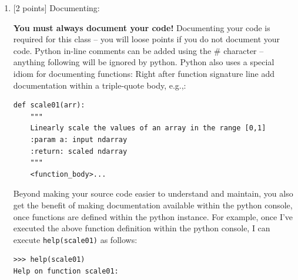 \documentclass[10pt]{article}
\begin{document}
\begin{enumerate}
\begin{verbatim}

def main():
    """
    main
    :param: none
    :return: void
    """
    exercise6("../data/humu.txt", "out.txt")

def scale01(arr):
    """
    Linearly scale the values of an array in the range [0,1]
    :param arr: input ndarray
    :return: scaled ndarray
    """
    return arr / arr.max()
    
def exercise6(infile, outfile):
    """
    Read a file into a Numpy ndarray
    :param infile: the file to read
    :param outfile: where to write the output
    :return: void
    """
    dat = np.loadtxt(infile)

    scaled = scale01(dat)
    print('scaled min = {} max = {} shape = {}'.format(scaled.min(),
                                                       scaled.max(),
                                                       scaled.shape))

    plt.figure()
    plt.imshow(dat)
    plt.show()

    print(plt.cm.cmapname)

    plt.imshow(dat, cmap='gray')
    plt.show()

    for _ in range(0, 2):
        ran = np.random.random(dat.shape)
        plt.imshow(ran)
        plt.show()
        np.savetxt(outfile, ran)

    ran1 = np.loadtxt(outfile)
    plt.imshow(ran1)
    plt.show()

    print('Done.')

if __name__ == '__main__':
    main()

$ ./hw1.py
type = <class 'numpy.ndarray'>
size = 210816
shape = (366, 576)
max = 0.9450980392156862
min = 0.0
scaled min = 0.0 max = 1.0 shape = (366, 576)
tab20c_r
Done.

\end{verbatim}


\item \label{prob:8} [2 points]
Documenting:

{\bf You must always document your code!}  Documenting your code is {\color{red} required} for this class -- you will loose points if you do not document your code.  Python in-line comments can be added using the \# character -- anything following will be ignored by python.  Python also uses a special idiom for documenting functions: Right after function signature line add documentation within a triple-quote body, e.g.,:
\begin{verbatim}
def scale01(arr):
    """
    Linearly scale the values of an array in the range [0,1]
    :param a: input ndarray
    :return: scaled ndarray
    """
    <function_body>...
\end{verbatim}
Beyond making your source code easier to understand and maintain, you also get the benefit of making documentation available within the python console, once functions are defined within the python instance.  For example, once I've executed the above function definition within the python console, I can execute {\tt help(scale01)} as follows:
\begin{verbatim}
>>> help(scale01)
Help on function scale01:


\end{verbatim}
\end{enumerate}
\end{document}
